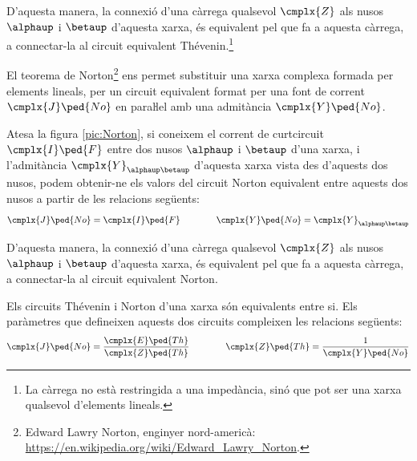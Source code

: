 D'aquesta manera, la connexió d'una càrrega qualsevol $\cmplx{Z}$ als nusos $\alphaup$ i $\betaup$ d'aquesta xarxa, és
equivalent pel que fa a aquesta càrrega, a connectar-la al circuit
equivalent Thévenin.\footnote{\label{fn:Th-No}La càrrega no està restringida a una impedància, sinó que pot ser una xarxa qualsevol d'elements lineals.}
\begin{center}
    
    \label{pic:Thevenin}
\end{center}

El teorema de Norton\footnote{Edward Lawry Norton, enginyer nord-americà: \href{https://en.wikipedia.org/wiki/Edward_Lawry_Norton}{https:/\!\!/en.wikipedia.org/wiki/Edward\_Lawry\_Norton}.} ens permet substituir
una xarxa complexa formada per elements lineals, per un circuit
equivalent format per una font de corrent $\cmplx{J}\ped{No}$ en
paraŀlel amb una admitància $\cmplx{Y}\ped{No}$.

Atesa la figura \vref{pic:Norton}, si coneixem el corrent de
curtcircuit $\cmplx{I}\ped{F}$ entre dos nusos $\alphaup$ i $\betaup$
d'una xarxa, i l'admitància $\cmplx{Y}_{\alphaup\betaup}$ d'aquesta
xarxa vista des d'aquests dos nusos, podem obtenir-ne els valors del
circuit Norton equivalent entre aquests dos nusos a partir de les
relacions següents:
\begin{equation}
   \cmplx{J}\ped{No} = \cmplx{I}\ped{F} \qquad\qquad \cmplx{Y}\ped{No} = \cmplx{Y}_{\alphaup\betaup}
\end{equation}

D'aquesta manera, la connexió d'una càrrega qualsevol $\cmplx{Z}$ als nusos $\alphaup$ i $\betaup$ d'aquesta xarxa, és
equivalent pel que fa a aquesta càrrega, a connectar-la al circuit
equivalent Norton.
\begin{center}
    
    \label{pic:Norton}
\end{center}

Els circuits Thévenin i Norton d'una xarxa són equivalents entre si.
Els paràmetres que defineixen aquests dos circuits compleixen les relacions
següents:
\begin{equation}\label{eq:Thevenin-Norton}
     \cmplx{J}\ped{No} = \frac{\cmplx{E}\ped{Th}}{\cmplx{Z}\ped{Th}} \qquad\qquad
    \cmplx{Z}\ped{Th} = \frac{1}{\cmplx{Y}\ped{No}}
\end{equation}

